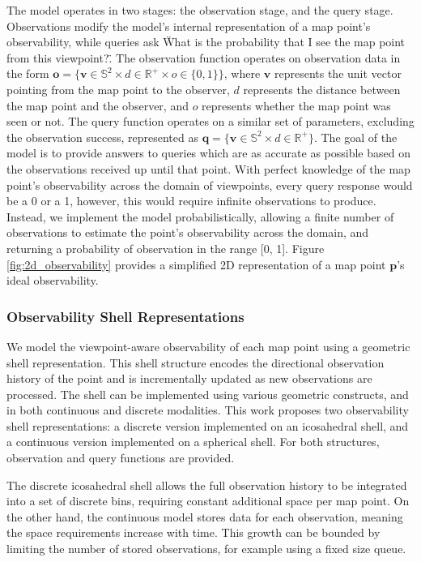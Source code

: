 The model operates in two stages: the observation stage, and the query stage. Observations modify the model's internal representation of a map point's observability, while queries ask \"What is the probability that I see the map point from this viewpoint?\". The observation function operates on observation data in the form $\boldsymbol{o} = \{\boldsymbol{v}\in\mathbb{S}^2\times d\in\mathbb{R}^+\times o\in\{0, 1\}\}$, where $\boldsymbol{v}$ represents the unit vector pointing from the map point to the observer, $d$ represents the distance between the map point and the observer, and $o$ represents whether the map point was seen or not. The query function operates on a similar set of parameters, excluding the observation success, represented as $\boldsymbol{q} = \{\boldsymbol{v}\in\mathbb{S}^2\times d\in\mathbb{R}^+\}$. The goal of the model is to provide answers to queries which are as accurate as possible based on the observations received up until that point. With perfect knowledge of the map point's observability across the domain of viewpoints, every query response would be a 0 or a 1, however, this would require infinite observations to produce. Instead, we implement the model probabilistically, allowing a finite number of observations to estimate the point's observability across the domain, and returning a probability of observation in the range [0, 1]. Figure \ref{fig:2d_observability} provides a simplified 2D representation of a map point $\boldsymbol{p}$'s ideal observability.



\subsubsection{Observability Shell Representations}

We model the viewpoint-aware observability of each map point using a geometric shell representation. This shell structure encodes the directional observation history of the point and is incrementally updated as new observations are processed. The shell can be implemented using various geometric constructs, and in both continuous and discrete modalities. This work proposes two observability shell representations: a discrete version implemented on an icosahedral shell, and a continuous version implemented on a spherical shell. For both structures, observation and query functions are provided.

The discrete icosahedral shell allows the full observation history to be integrated into a set of discrete bins, requiring constant additional space per map point. On the other hand, the continuous model stores data for each observation, meaning the space requirements increase with time. This growth can be bounded by limiting the number of stored observations, for example using a fixed size queue.

